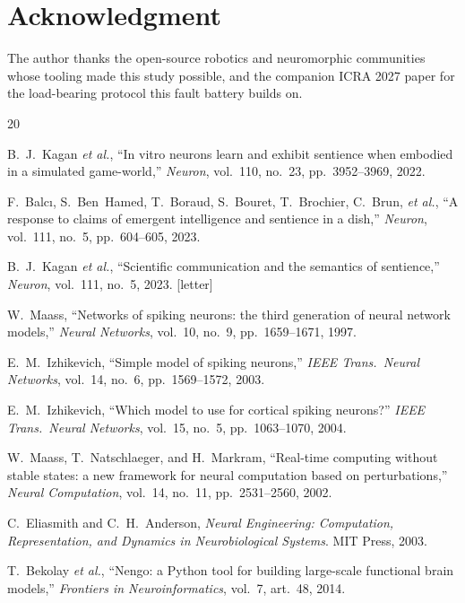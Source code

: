 \section*{Acknowledgment}

The author thanks the open-source robotics and neuromorphic communities whose
tooling made this study possible, and the companion ICRA 2027 paper for the
load-bearing protocol this fault battery builds on.

\begin{thebibliography}{20}

B.~J.~Kagan \emph{et al.}, ``In vitro neurons learn and exhibit sentience when
embodied in a simulated game-world,'' \emph{Neuron}, vol.~110, no.~23,
pp.~3952--3969, 2022.

F.~Balc{\i}, S.~Ben~Hamed, T.~Boraud, S.~Bouret, T.~Brochier, C.~Brun,
\emph{et al.}, ``A response to claims of emergent intelligence and sentience in
a dish,'' \emph{Neuron}, vol.~111, no.~5, pp.~604--605, 2023.

B.~J.~Kagan \emph{et al.}, ``Scientific communication and the semantics of
sentience,'' \emph{Neuron}, vol.~111, no.~5, 2023. [letter]

W.~Maass, ``Networks of spiking neurons: the third generation of neural network
models,'' \emph{Neural Networks}, vol.~10, no.~9, pp.~1659--1671, 1997.

E.~M.~Izhikevich, ``Simple model of spiking neurons,'' \emph{IEEE Trans.\
Neural Networks}, vol.~14, no.~6, pp.~1569--1572, 2003.

E.~M.~Izhikevich, ``Which model to use for cortical spiking neurons?''
\emph{IEEE Trans.\ Neural Networks}, vol.~15, no.~5, pp.~1063--1070, 2004.

W.~Maass, T.~Natschlaeger, and H.~Markram, ``Real-time computing without stable
states: a new framework for neural computation based on perturbations,''
\emph{Neural Computation}, vol.~14, no.~11, pp.~2531--2560, 2002.

C.~Eliasmith and C.~H.~Anderson, \emph{Neural Engineering: Computation,
Representation, and Dynamics in Neurobiological Systems}. MIT Press, 2003.

T.~Bekolay \emph{et al.}, ``Nengo: a Python tool for building large-scale
functional brain models,'' \emph{Frontiers in Neuroinformatics}, vol.~7,
art.~48, 2014.


\end{thebibliography}
